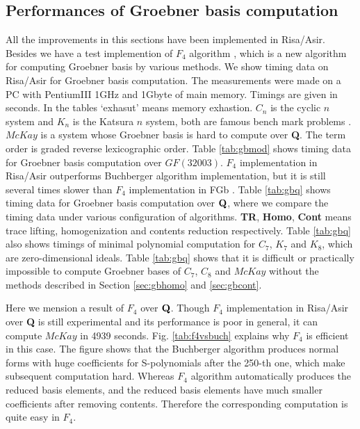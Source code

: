 \documentclass[runningheads]{cl2emult}
\def\Q{{\bf Q}}
\begin{document}

\subsection{Performances of Groebner basis computation}

All the improvements in this sections have been implemented in
Risa/Asir. Besides we have a test implemention of $F_4$ algorithm
\cite{noro:F4}, which is a new algorithm for computing Groebner basis
by various methods.  We show timing data on Risa/Asir for Groebner
basis computation.  The measurements were made on a PC with PentiumIII
1GHz and 1Gbyte of main memory. Timings are given in seconds. In the
tables `exhasut' means memory exhastion.  $C_n$ is the cyclic $n$
system and $K_n$ is the Katsura $n$ system, both are famous bench mark
problems \cite{noro:BENCH}.  $McKay$ \cite{noro:REPL} is a system
whose Groebner basis is hard to compute over {\bf Q}.  The term order
is graded reverse lexicographic order.  Table \ref{tab:gbmod} shows
timing data for Groebner basis computation over $GF(32003)$.  $F_4$
implementation in Risa/Asir outperforms Buchberger algorithm
implementation, but it is still several times slower than $F_4$
implementation in FGb \cite{noro:FGB}.  Table \ref{tab:gbq} shows
timing data for Groebner basis computation over $\Q$, where we compare
the timing data under various configuration of algorithms. {\bf TR},
{\bf Homo}, {\bf Cont} means trace lifting, homogenization and
contents reduction respectively.  Table \ref{tab:gbq} also shows
timings of minimal polynomial computation for 
$C_7$, $K_7$ and $K_8$, which are zero-dimensional ideals.
Table \ref{tab:gbq} shows that it is difficult or practically
impossible to compute Groebner bases of $C_7$, $C_8$ and $McKay$
without the methods described in Section \ref{sec:gbhomo} and
\ref{sec:gbcont}. 

Here we mension a result of $F_4$ over $\Q$.  Though $F_4$
implementation in Risa/Asir over {\bf Q} is still experimental and its
performance is poor in general, it can compute $McKay$ in 4939 seconds.
Fig. \ref{tab:f4vsbuch} explains why $F_4$ is efficient in this case.
The figure shows that the Buchberger algorithm produces normal forms
with huge coefficients for S-polynomials after the 250-th one, which
make subsequent computation hard.  Whereas $F_4$ algorithm
automatically produces the reduced basis elements, and the reduced
basis elements have much smaller coefficients after removing contents.
Therefore the corresponding computation is quite easy in $F_4$.
\end{document}
